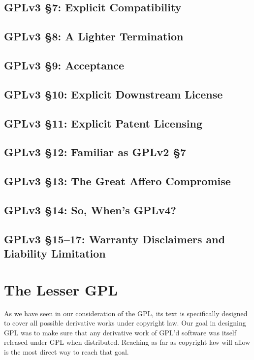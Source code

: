\section{GPLv3 \S 7: Explicit Compatibility}

\section{GPLv3 \S 8: A Lighter Termination}

\section{GPLv3 \S 9: Acceptance}

\section{GPLv3 \S 10: Explicit Downstream License}

\section{GPLv3 \S 11: Explicit Patent Licensing}
\label{GPLv3s11}
\section{GPLv3 \S 12: Familiar as GPLv2 \S 7}

\section{GPLv3 \S 13: The Great Affero Compromise}

\section{GPLv3 \S 14: So, When's GPLv4?}
\label{GPlv2s14}
\section{GPLv3 \S 15--17: Warranty Disclaimers and Liability Limitation}


\chapter{The Lesser GPL}

As we have seen in our consideration of the GPL, its text is specifically
designed to cover all possible derivative works under copyright law. Our
goal in designing GPL was to make sure that any derivative work of GPL'd
software was itself released under GPL when distributed. Reaching as far
as copyright law will allow is the most direct way to reach that goal.

